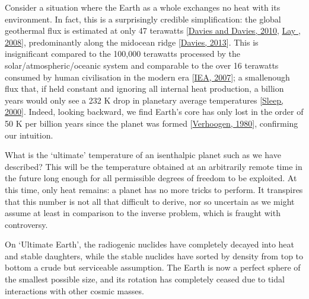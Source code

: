 \documentclass[letterpaper,10pt,english]{jupyterBook}
\begin{document}
\sphinxAtStartPar
Consider a situation where the Earth as a whole exchanges no heat with its environment. In fact, this is a surprisingly credible simplification: the global geothermal flux is estimated at only 47 terawatts {[}\hyperlink{cite.references:id646}{Davies and Davies, 2010}, \hyperlink{cite.references:id20}{Lay , 2008}{]}, predominantly along the mid\sphinxhyphen{}ocean ridge {[}\hyperlink{cite.references:id323}{Davies, 2013}{]}. This is insignificant compared to the 100,000 terawatts processed by the solar/atmospheric/oceanic system and comparable to the over 16 terawatts consumed by human civilisation in the modern era {[}\hyperlink{cite.references:id348}{IEA, 2007}{]}; a small\sphinxhyphen{}enough flux that, if held constant and ignoring all internal heat production, a billion years would only see a 232 K drop in planetary average temperatures {[}\hyperlink{cite.references:id255}{Sleep, 2000}{]}. Indeed, looking backward, we find Earth’s core has only lost in the order of 50 K per billion years since the planet was formed {[}\hyperlink{cite.references:id349}{Verhoogen, 1980}{]}, confirming our intuition.

\sphinxAtStartPar
What is the ‘ultimate’ temperature of an isenthalpic planet such as we have described? This will be the temperature obtained at an arbitrarily remote time in the future \sphinxhyphen{} long enough for all permissible degrees of freedom to be exploited. At this time, only heat remains: a planet has no more tricks to perform. It transpires that this number is not all that difficult to derive, nor so uncertain as we might assume \sphinxhyphen{} at least in comparison to the inverse problem, which is fraught with controversy.

\sphinxAtStartPar
On ‘Ultimate Earth’, the radiogenic nuclides have completely decayed into heat and stable daughters, while the stable nuclides have sorted by density from top to bottom \sphinxhyphen{} a crude but serviceable assumption. The Earth is now a perfect sphere of the smallest possible size, and its rotation has completely ceased due to tidal interactions with other cosmic masses.
\end{document}
